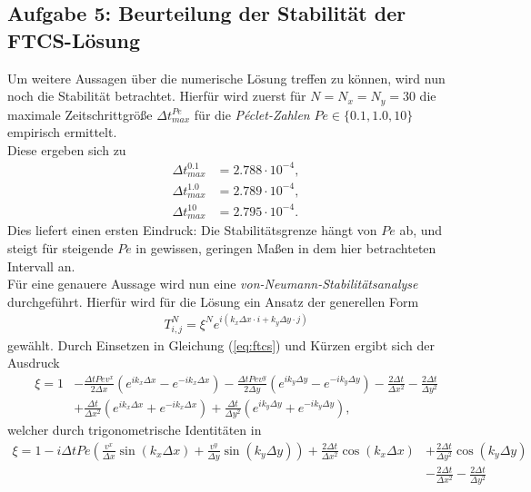 \documentclass[12pt,a4paper,titlepage,headinclude,bibtotoc]{scrartcl}
\begin{document}
\hfill%



\subsection{Aufgabe 5: Beurteilung der Stabilität der FTCS-Lösung}
\label{sec:task5}
Um weitere Aussagen über die numerische Lösung treffen zu können, wird nun noch die Stabilität betrachtet. Hierfür wird zuerst für $N=N_x=N_y = 30$ die maximale Zeitschrittgröße $\Delta t^{Pe}_{max}$ für die \textit{Péclet-Zahlen} $Pe \in \{0.1, 1.0, 10\}$ empirisch ermittelt.\\
Diese ergeben sich zu
\begin{align*}
\Delta t^{0.1}_{max} &= 2.788 \cdot 10^{-4}, \\
\Delta t^{1.0}_{max} &= 2.789 \cdot 10^{-4}, \\
\Delta t^{10}_{max}  &= 2.795 \cdot 10^{-4} .
\end{align*}
Dies liefert einen ersten Eindruck: Die Stabilitätsgrenze hängt von $Pe$ ab, und steigt für steigende $Pe$ in gewissen, geringen Maßen in dem hier betrachteten Intervall an.\\
Für eine genauere Aussage wird nun eine \textit{von-Neumann-Stabilitätsanalyse} durchgeführt. Hierfür wird für die Lösung ein Ansatz der generellen Form
\begin{align*}
T^N_{i,j} = \xi^N e^{i(k_x \Delta x \cdot i + k_y \Delta y \cdot j)}
\end{align*}
gewählt.
Durch Einsetzen in Gleichung (\ref{eq:ftcs}) und Kürzen ergibt sich der Ausdruck
\begin{align*}
\xi = 1 &- \frac{\Delta t Pe v^x}{2 \Delta x} \left( e^{i k_x \Delta x} - e^{-i k_x \Delta x} \right) - \frac{\Delta t Pe v^y}{2 \Delta y} \left( e^{i k_y \Delta y} - e^{-i k_y \Delta y} \right) -\frac{2 \Delta t}{\Delta x^2} - \frac{2 \Delta t}{\Delta y^2} \\
 &+ \frac{\Delta t}{\Delta x^2} \left( e^{i k_x \Delta x} + e^{-i k_x \Delta x} \right) +\frac{\Delta t}{\Delta y^2} \left( e^{i k_y \Delta y} + e^{-i k_y \Delta y} \right),
\end{align*}
welcher durch trigonometrische Identitäten in
\begin{align*}
\xi = 1 - i \Delta t Pe\left(\frac{ v^x }{\Delta x} \sin(k_x \Delta x) + \frac{v^y}{\Delta y}  \sin(k_y \Delta y) \right) + \frac{2 \Delta t}{\Delta x^2}\cos(k_x \Delta x) &+ \frac{2 \Delta t}{\Delta y^2}\cos(k_y \Delta y) \\ &-\frac{2 \Delta t}{\Delta x^2} - \frac{2 \Delta t}{\Delta y^2}
\end{align*}
\end{document}
